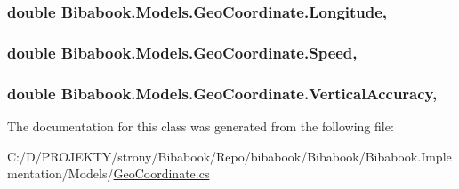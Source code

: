 \subsubsection[{Longitude}]{\setlength{\rightskip}{0pt plus 5cm}double Bibabook.\+Models.\+Geo\+Coordinate.\+Longitude\hspace{0.3cm}{\ttfamily [get]}, {\ttfamily [set]}}\label{class_bibabook_1_1_models_1_1_geo_coordinate_afdf659db7469b49685ee37246c2d46b6}
\hypertarget{class_bibabook_1_1_models_1_1_geo_coordinate_a50a331168aeaf8c9b39624cb9956ccf4}{}
\subsubsection[{Speed}]{\setlength{\rightskip}{0pt plus 5cm}double Bibabook.\+Models.\+Geo\+Coordinate.\+Speed\hspace{0.3cm}{\ttfamily [get]}, {\ttfamily [set]}}\label{class_bibabook_1_1_models_1_1_geo_coordinate_a50a331168aeaf8c9b39624cb9956ccf4}
\hypertarget{class_bibabook_1_1_models_1_1_geo_coordinate_a40c08d058ae8d7908144a8d95603bd52}{}
\subsubsection[{Vertical\+Accuracy}]{\setlength{\rightskip}{0pt plus 5cm}double Bibabook.\+Models.\+Geo\+Coordinate.\+Vertical\+Accuracy\hspace{0.3cm}{\ttfamily [get]}, {\ttfamily [set]}}\label{class_bibabook_1_1_models_1_1_geo_coordinate_a40c08d058ae8d7908144a8d95603bd52}


The documentation for this class was generated from the following file\+:\begin{DoxyCompactItemize}
\item 
C\+:/\+D/\+P\+R\+O\+J\+E\+K\+T\+Y/strony/\+Bibabook/\+Repo/bibabook/\+Bibabook/\+Bibabook.\+Implementation/\+Models/\hyperlink{_geo_coordinate_8cs}{Geo\+Coordinate.\+cs}\end{DoxyCompactItemize}
